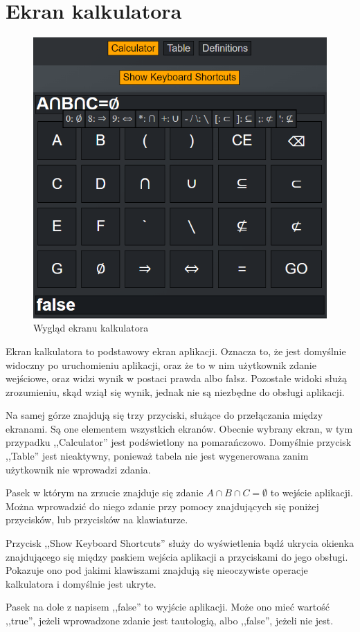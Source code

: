 \documentclass{SGGW-thesis}
\begin{document}
\section{Ekran kalkulatora}
\begin{figure}[h]
    \hspace{1.5cm}
    \includegraphics{screenshots/calc.png}
    \caption{Wygląd ekranu kalkulatora}
    \label{fig:calc}
\end{figure}
    
\begin{paragraph}{}
    Ekran kalkulatora to podstawowy ekran aplikacji. Oznacza to, że jest domyślnie widoczny po uruchomieniu aplikacji, oraz że to w nim użytkownik zdanie wejściowe, oraz widzi wynik w postaci prawda albo fałsz. Pozostałe widoki służą zrozumieniu, skąd wziął się wynik, jednak nie są niezbędne do obsługi aplikacji.

    Na samej górze znajdują się trzy przyciski, służące do przełączania między ekranami. Są one elementem wszystkich ekranów. Obecnie wybrany ekran, w tym przypadku ,,Calculator'' jest podświetlony na pomarańczowo. Domyślnie przycisk ,,Table'' jest nieaktywny, ponieważ tabela nie jest wygenerowana zanim użytkownik nie wprowadzi zdania.

    Pasek w którym na zrzucie znajduje się zdanie $A \cap B \cap C = \emptyset$ to wejście aplikacji. Można wprowadzić do niego zdanie przy pomocy znajdujących się poniżej przycisków, lub przycisków na klawiaturze.

    Przycisk ,,Show Keyboard Shortcuts'' służy do wyświetlenia bądź ukrycia okienka znajdującego się między paskiem wejścia aplikacji a przyciskami do jego obsługi. Pokazuje ono pod jakimi klawiszami znajdują się nieoczywiste operacje kalkulatora i domyślnie jest ukryte.

    Pasek na dole z napisem ,,false'' to wyjście aplikacji. Może ono mieć wartość ,,true'', jeżeli wprowadzone zdanie jest tautologią, albo ,,false'', jeżeli nie jest.
\end{paragraph}
\end{document}
